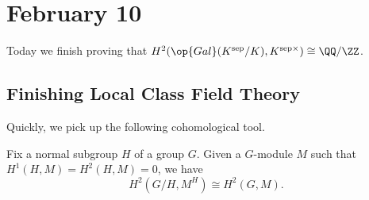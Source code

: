 \documentclass[../notes.tex]{subfiles}
\begin{document}
\section{February 10}

Today we finish proving that $H^2(\op{Gal}(K^{\mathrm{sep}}/K),K^{\mathrm{sep}\times})\cong\QQ/\ZZ$.

\subsection{Finishing Local Class Field Theory}
Quickly, we pick up the following cohomological tool.
\begin{proposition} \label{prop:res-inf}
	Fix a normal subgroup $H$ of a group $G$. Given a $G$-module $M$ such that $H^1(H,M)=H^2(H,M)=0$, we have
	\[H^2\left(G/H,M^H\right)\cong H^2(G,M).\]
\end{proposition}
\end{document}
